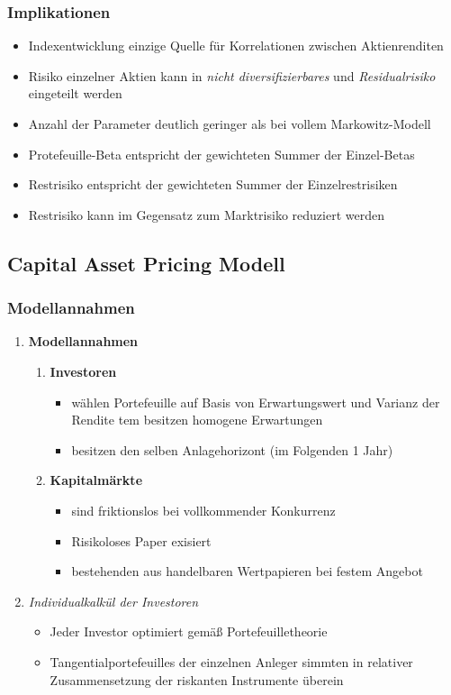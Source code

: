 \subsubsection{Implikationen}
\begin{itemize}
	\item Indexentwicklung einzige Quelle für Korrelationen zwischen Aktienrenditen
	\item Risiko einzelner Aktien kann in \textit{nicht diversifizierbares} und \textit{Residualrisiko} eingeteilt werden
	\item Anzahl der Parameter deutlich geringer als bei vollem Markowitz-Modell
	\item Protefeuille-Beta entspricht der gewichteten Summer der Einzel-Betas
	\item Restrisiko entspricht der gewichteten Summer der Einzelrestrisiken
	\item Restrisiko kann im Gegensatz zum Marktrisiko reduziert werden
\end{itemize}


\subsection{Capital Asset Pricing Modell}

\subsubsection{Modellannahmen}
\begin{enumerate}
	\item \textbf{Modellannahmen}
	\begin{enumerate}
		\item \textbf{Investoren}
		\begin{itemize}
			\item wählen Portefeuille auf Basis von Erwartungswert und Varianz der Rendite
			tem besitzen homogene Erwartungen
			\item besitzen den selben Anlagehorizont (im Folgenden 1 Jahr)
		\end{itemize}
		\item \textbf{Kapitalmärkte}
		\begin{itemize}
			\item sind friktionslos bei vollkommender Konkurrenz
			\item Risikoloses Paper exisiert
			\item bestehenden aus handelbaren Wertpapieren bei festem Angebot
		\end{itemize}
	\end{enumerate}
	\item \textit{Individualkalkül der Investoren}
	\begin{itemize}
		\item Jeder Investor optimiert gemäß Portefeuilletheorie
		\item Tangentialportefeuilles der einzelnen Anleger simmten in relativer Zusammensetzung der riskanten Instrumente überein
	\end{itemize}
\end{enumerate}


